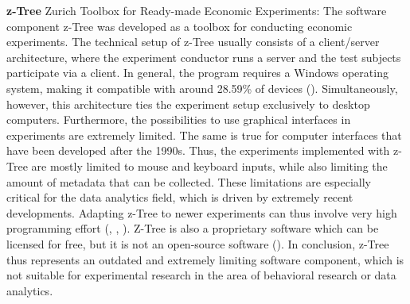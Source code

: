 
\textbf{z-Tree} Zurich Toolbox for Ready-made Economic Experiments:
The software component z-Tree was developed as a toolbox for conducting economic experiments. The technical setup of z-Tree usually consists of a client/server architecture, where the experiment conductor runs a server and the test subjects participate via a client. In general, the program requires a Windows operating system, making it compatible with around 28.59\% of devices (\cite{statcounter.2023}). Simultaneously, however, this architecture ties the experiment setup exclusively to desktop computers. Furthermore, the possibilities to use graphical interfaces in experiments are extremely limited. The same is true for computer interfaces that have been developed after the 1990s. Thus, the experiments implemented with z-Tree are mostly limited to mouse and keyboard inputs, while also limiting the amount of metadata that can be collected. These limitations are especially critical for the data analytics field, which is driven by extremely recent developments. Adapting z-Tree to newer experiments can thus involve very high programming effort (\cite{Zurich.2023}, \cite{Fischbacher.2006}, \cite{Chen.2016}). Z-Tree is also a proprietary software which can be licensed for free, but it is not an open-source software (\cite{Fischbacher.2006}). In conclusion, z-Tree thus represents an outdated and extremely limiting software component, which is not suitable for experimental research in the area of behavioral research or data analytics.

